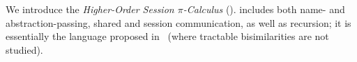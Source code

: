 \noindent 
We introduce the %
\emph{Higher-Order Session $\pi$-Calculus} (\HOp).
\HOp includes both name- and abstraction-passing, shared and session communication,  
as well as recursion; it is 
essentially 
the  language
proposed 
in~\cite{tlca07} (where tractable bisimilarities are not studied). 

\smallskip





